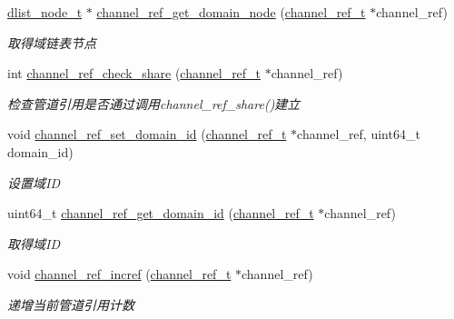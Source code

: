 \begin{DoxyCompactItemize}
\hyperlink{a00050_a62053232bcf3566010ef98a7d77c3cc8_a62053232bcf3566010ef98a7d77c3cc8}{dlist\+\_\+node\+\_\+t} $\ast$ \hyperlink{a00047_ab5e94cb95124a4c5db7ddf5750a9bb17_ab5e94cb95124a4c5db7ddf5750a9bb17}{channel\+\_\+ref\+\_\+get\+\_\+domain\+\_\+node} (\hyperlink{a00050_a151271c9d188ef28d4d24bb81dcc1263_a151271c9d188ef28d4d24bb81dcc1263}{channel\+\_\+ref\+\_\+t} $\ast$channel\+\_\+ref)
\begin{DoxyCompactList}\small\item\em 取得域链表节点 \end{DoxyCompactList}\item 
int \hyperlink{a00047_ab71c6ed6109fedf4cf941b8de498a622_ab71c6ed6109fedf4cf941b8de498a622}{channel\+\_\+ref\+\_\+check\+\_\+share} (\hyperlink{a00050_a151271c9d188ef28d4d24bb81dcc1263_a151271c9d188ef28d4d24bb81dcc1263}{channel\+\_\+ref\+\_\+t} $\ast$channel\+\_\+ref)
\begin{DoxyCompactList}\small\item\em 检查管道引用是否通过调用channel\+\_\+ref\+\_\+share()建立 \end{DoxyCompactList}\item 
void \hyperlink{a00047_a66387736035e1c761a9ceebf3c33d9cf_a66387736035e1c761a9ceebf3c33d9cf}{channel\+\_\+ref\+\_\+set\+\_\+domain\+\_\+id} (\hyperlink{a00050_a151271c9d188ef28d4d24bb81dcc1263_a151271c9d188ef28d4d24bb81dcc1263}{channel\+\_\+ref\+\_\+t} $\ast$channel\+\_\+ref, uint64\+\_\+t domain\+\_\+id)
\begin{DoxyCompactList}\small\item\em 设置域\+I\+D \end{DoxyCompactList}\item 
uint64\+\_\+t \hyperlink{a00047_a8498a205a4580c25c337a33b571396f7_a8498a205a4580c25c337a33b571396f7}{channel\+\_\+ref\+\_\+get\+\_\+domain\+\_\+id} (\hyperlink{a00050_a151271c9d188ef28d4d24bb81dcc1263_a151271c9d188ef28d4d24bb81dcc1263}{channel\+\_\+ref\+\_\+t} $\ast$channel\+\_\+ref)
\begin{DoxyCompactList}\small\item\em 取得域\+I\+D \end{DoxyCompactList}\item 
void \hyperlink{a00047_aef059f673946f97e8b892b600f839af1_aef059f673946f97e8b892b600f839af1}{channel\+\_\+ref\+\_\+incref} (\hyperlink{a00050_a151271c9d188ef28d4d24bb81dcc1263_a151271c9d188ef28d4d24bb81dcc1263}{channel\+\_\+ref\+\_\+t} $\ast$channel\+\_\+ref)
\begin{DoxyCompactList}\small\item\em 递增当前管道引用计数 \end{DoxyCompactList}\item 

\end{DoxyCompactItemize}
